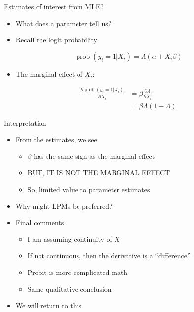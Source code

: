 \documentclass[
  ignorenonframetext,
]{beamer}
\providecommand{\tightlist}{%
  \setlength{\itemsep}{0pt}\setlength{\parskip}{0pt}}
\DeclareMathOperator{\prob}{prob}
\begin{document}
\begin{frame}{Estimates of interest from MLE?}
\protect{}\label{estimates-of-interest-from-mle}
\begin{itemize}
\tightlist
\item
  What does a parameter tell us?
\item
  Recall the logit probability
\end{itemize}

\[
\prob(y_i=1|X_i) = \Lambda(\alpha + X_i\beta)
\]

\begin{itemize}
\tightlist
\item
  The marginal effect of \(X_i\):
\end{itemize}

\[
\begin{split}
\frac{\partial \prob(y_i=1|X_i)}{\partial X_i} &= \beta
\frac{\partial \Lambda}{\partial X_i} \\
 &= \beta \Lambda (1-\Lambda) 
\end{split}
\]
\end{frame}

\begin{frame}{Interpretation}
\protect{}\label{interpretation}
\begin{itemize}
\item
  From the estimates, we see

  \begin{itemize}
  \tightlist
  \item
    \(\beta\) has the same sign as the marginal effect
  \item
    BUT, IT IS NOT THE MARGINAL EFFECT
  \item
    So, limited value to parameter estimates
  \end{itemize}
\item
  Why might LPMs be preferred?
\item
  Final comments

  \begin{itemize}
  \tightlist
  \item
    I am assuming continuity of \(X\)
  \item
    If not continuous, then the derivative is a ``difference''
  \item
    Probit is more complicated math
  \item
    Same qualitative conclusion
  \end{itemize}
\item
  We will return to this
\end{itemize}
\end{frame}
\end{document}
